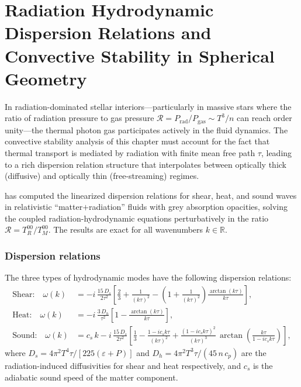\section{Radiation Hydrodynamic Dispersion Relations and Convective Stability
  in Spherical Geometry}
\label{sec:rel-rad-hydro-dispersion}

In radiation-dominated stellar interiors---particularly in massive stars
where the ratio of radiation pressure to gas pressure
$\mathcal{R} = P_{\mathrm{rad}}/P_{\mathrm{gas}} \sim T^3/n$ can reach
order unity---the thermal photon gas participates actively in the fluid
dynamics.  The convective stability analysis of this chapter must account
for the fact that thermal transport is mediated by radiation with finite
mean free path $\tau$, leading to a rich dispersion relation structure
that interpolates between optically thick (diffusive) and optically thin
(free-streaming) regimes.

\citet{GavassinoRadDispersion2025} has computed the linearized dispersion
relations for shear, heat, and sound waves in relativistic
``matter$+$radiation'' fluids with grey absorption opacities, solving the
coupled radiation-hydrodynamic equations perturbatively in the ratio
$\mathcal{R} = T_R^{00}/T_M^{00}$.  The results are exact for all
wavenumbers $k \in \mathbb{R}$.

\subsubsection{Dispersion relations}
The three types of hydrodynamic modes have the following dispersion relations:
\begin{align}
  \text{Shear:}\quad
  \omega(k) &= -i\,\frac{15\,D_s}{2\tau^2}
  \left[\frac{2}{3} + \frac{1}{(k\tau)^2}
  - \left(1 + \frac{1}{(k\tau)^2}\right)\frac{\arctan(k\tau)}{k\tau}\right],
  \label{eq:rad-shear} \\[6pt]
  \text{Heat:}\quad
  \omega(k) &= -i\,\frac{3\,D_h}{\tau^2}
  \left[1 - \frac{\arctan(k\tau)}{k\tau}\right],
  \label{eq:rad-heat} \\[6pt]
  \text{Sound:}\quad
  \omega(k) &= c_s\,k - i\,\frac{15\,D_s}{2\tau^2}
  \left[\frac{1}{3} - \frac{1 - ic_s k\tau}{(k\tau)^2}
  + \frac{(1 - ic_s k\tau)^2}{(k\tau)^3}\,
    \arctan\!\left(\frac{k\tau}{1 - ic_s k\tau}\right)\right],
  \label{eq:rad-sound}
\end{align}
where $D_s = 4\pi^2 T^4\tau/[225(\varepsilon + P)]$ and
$D_h = 4\pi^2 T^3\tau/(45\,n\,c_p)$ are the radiation-induced
diffusivities for shear and heat respectively, and $c_s$ is the
adiabatic sound speed of the matter component.


